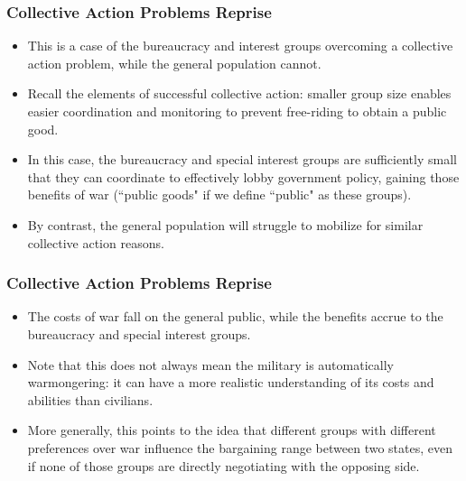 \documentclass{beamer}
\begin{document}
\begin{frame} 
	\frametitle{\LARGE{Collective Action Problems Reprise}}
	\begin{itemize}
		\item This is a case of the bureaucracy and interest groups overcoming a collective action problem, while the general population cannot. \pause
		\item Recall the elements of successful collective action: smaller group size enables easier coordination and monitoring to prevent free-riding to obtain a public good. \pause
		\item In this case, the bureaucracy and special interest groups are sufficiently small that they can coordinate to effectively lobby government policy, gaining those benefits of war (``public goods" if we define ``public" as these groups).
		\item By contrast, the general population will struggle to mobilize for similar collective action reasons.
	\end{itemize}
\end{frame}

\begin{frame} 
	\frametitle{\LARGE{Collective Action Problems Reprise}}
	\begin{itemize}
		\item The costs of war fall on the general public, while the benefits accrue to the bureaucracy and special interest groups. \pause
		\item Note that this does not always mean the military is automatically warmongering: it can have a more realistic understanding of its costs and abilities than civilians. \pause
		\item More generally, this points to the idea that different groups with different preferences over war influence the bargaining range between two states, even if none of those groups are directly negotiating with the opposing side.
	\end{itemize}
\end{frame}

\end{document}
